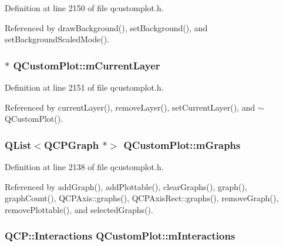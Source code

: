 Definition at line 2150 of file qcustomplot.\+h.



Referenced by draw\+Background(), set\+Background(), and set\+Background\+Scaled\+Mode().

\hypertarget{class_q_custom_plot_aa27569c92e74395af10151357d268628}{}
\subsubsection[{m\+Current\+Layer}]{$\ast$ Q\+Custom\+Plot\+::m\+Current\+Layer\hspace{0.3cm}{\ttfamily [protected]}}\label{class_q_custom_plot_aa27569c92e74395af10151357d268628}


Definition at line 2151 of file qcustomplot.\+h.



Referenced by current\+Layer(), remove\+Layer(), set\+Current\+Layer(), and $\sim$\+Q\+Custom\+Plot().

\hypertarget{class_q_custom_plot_a38676b141ac8005fca4882a73ddfaf59}{}
\subsubsection[{m\+Graphs}]{\setlength{\rightskip}{0pt plus 5cm}Q\+List$<${\bf Q\+C\+P\+Graph} $\ast$$>$ Q\+Custom\+Plot\+::m\+Graphs\hspace{0.3cm}{\ttfamily [protected]}}\label{class_q_custom_plot_a38676b141ac8005fca4882a73ddfaf59}


Definition at line 2138 of file qcustomplot.\+h.



Referenced by add\+Graph(), add\+Plottable(), clear\+Graphs(), graph(), graph\+Count(), Q\+C\+P\+Axis\+::graphs(), Q\+C\+P\+Axis\+Rect\+::graphs(), remove\+Graph(), remove\+Plottable(), and selected\+Graphs().

\hypertarget{class_q_custom_plot_ad717377ceba7493b4b32f0bcbbdf1895}{}
\subsubsection[{m\+Interactions}]{\setlength{\rightskip}{0pt plus 5cm}Q\+C\+P\+::\+Interactions Q\+Custom\+Plot\+::m\+Interactions\hspace{0.3cm}{\ttfamily [protected]}}\label{class_q_custom_plot_ad717377ceba7493b4b32f0bcbbdf1895}


